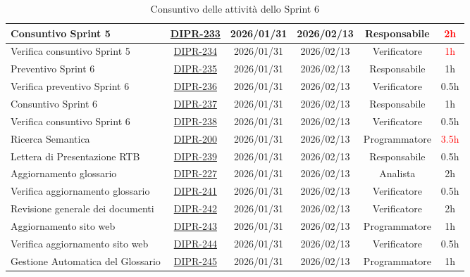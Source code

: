 \documentclass[a4paper,12pt]{article}
\begin{document}
\begin{table}[H]
\begin{adjustwidth}{-4cm}{-4cm}
\begin{spacing}{1}
\begin{tabular}{|p{4cm}|c|c|c|c|c|}
        \hline
        Consuntivo Sprint 5 & \href{https://7zpus.atlassian.net/browse/DIPR-233}{DIPR-233} & 2026/01/31 & 2026/02/13 & Responsabile & \textcolor{red}{2h} \\
        \hline
        Verifica consuntivo Sprint 5 & \href{https://7zpus.atlassian.net/browse/DIPR-234}{DIPR-234} & 2026/01/31 & 2026/02/13 & Verificatore & \textcolor{red}{1h} \\
        \hline
        Preventivo Sprint 6 & \href{https://7zpus.atlassian.net/browse/DIPR-235}{DIPR-235} & 2026/01/31 & 2026/02/13 & Responsabile & 1h \\
        \hline
        Verifica preventivo Sprint 6 & \href{https://7zpus.atlassian.net/browse/DIPR-236}{DIPR-236} & 2026/01/31 & 2026/02/13 & Verificatore & 0.5h \\
        \hline
        Consuntivo Sprint 6 & \href{https://7zpus.atlassian.net/browse/DIPR-237}{DIPR-237} & 2026/01/31 & 2026/02/13 & Responsabile & 1h \\
        \hline
        Verifica consuntivo Sprint 6 & \href{https://7zpus.atlassian.net/browse/DIPR-238}{DIPR-238} & 2026/01/31 & 2026/02/13 & Verificatore & 0.5h \\
        \hline
        Ricerca Semantica & \href{https://7zpus.atlassian.net/browse/DIPR-200}{DIPR-200} & 2026/01/31 & 2026/02/13 & Programmatore & \textcolor{red}{3.5h} \\
        \hline
        Lettera di Presentazione RTB & \href{https://7zpus.atlassian.net/browse/DIPR-239}{DIPR-239} & 2026/01/31 & 2026/02/13 & Responsabile & 0.5h \\
        \hline
        Aggiornamento glossario & \href{https://7zpus.atlassian.net/browse/DIPR-227}{DIPR-227} & 2026/01/31 & 2026/02/13 & Analista & 2h \\
        \hline
        Verifica aggiornamento glossario & \href{https://7zpus.atlassian.net/browse/DIPR-241}{DIPR-241} & 2026/01/31 & 2026/02/13 & Verificatore & 0.5h \\
        \hline
        Revisione generale dei documenti & \href{https://7zpus.atlassian.net/browse/DIPR-242}{DIPR-242} & 2026/01/31 & 2026/02/13 & Verificatore & 2h \\
        \hline
        Aggiornamento sito web & \href{https://7zpus.atlassian.net/browse/DIPR-243}{DIPR-243} & 2026/01/31 & 2026/02/13 & Programmatore & 1h \\
        \hline
        Verifica aggiornamento sito web & \href{https://7zpus.atlassian.net/browse/DIPR-244}{DIPR-244} & 2026/01/31 & 2026/02/13 & Verificatore & 0.5h \\
        \hline
        Gestione Automatica del Glossario & \href{https://7zpus.atlassian.net/browse/DIPR-245}{DIPR-245} & 2026/01/31 & 2026/02/13 & Programmatore & 1h \\
        \hline
    \end{tabular}
    \end{spacing}
    \caption{Consuntivo delle attività dello Sprint 6}
    \end{adjustwidth}
\end{table}
\end{document}
